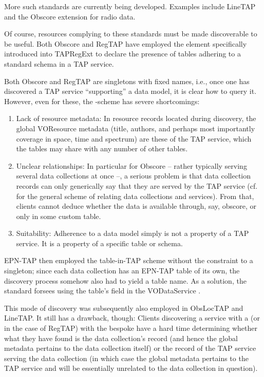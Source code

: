 \documentclass[11pt,a4paper]{ivoa}
\begin{document}
More such standards are currently being developed. Examples include LineTAP
\citep{wd:linetap23} and the Obscore extension for radio data.

Of course, resources complying to these standards must be made
discoverable to be useful.  Both Obscore and RegTAP have employed the
 element specifically introduced into TAPRegExt
\citep{2012ivoa.spec.0827D} to declare the presence of tables adhering
to a standard schema in a TAP service.

Both Obscore and RegTAP are singletons with fixed names, i.e., once one
has discovered a TAP service ``supporting'' a data model, it is clear
how to query it.  However, even for these, the -scheme
has severe shortcomings:

\begin{enumerate}
\item Lack of resource metadata: In resource records located during
discovery, the global VOResource metadata (title, authors, and perhaps
most importantly coverage in space, time and spectrum) are these of the
TAP service, which the tables may share with any number of other tables.

\item Unclear relationships: In particular for Obscore -- rather
typically serving several data collections at once --, a serious
problem is that data collection records can only generically say
that they are served by the TAP service (cf.~\citet{2019ivoa.spec.0520D}
for the general scheme of relating data collections and services).  From
that, clients cannot deduce whether the data is available through, say,
obscore, or only in some custom table.

\item Suitability: Adherence to a data model simply is not a property of a
TAP service.  It is a property of a specific table or schema.
\end{enumerate}

EPN-TAP then employed the table-in-TAP scheme without the constraint to
a singleton; since each data collection has an EPN-TAP table of its own,
the discovery process somehow also had to yield a table name.  As a
solution, the standard forsees using the table's  field in
the VODataService \citep{2010ivoa.spec.1202P} .

This mode of discovery was subsequently also employed in ObsLocTAP and
LineTAP.  It still has a drawback, though: Clients discovering a service
with a  (or  in the case of RegTAP) with the
bespoke  have a hard time determining whether what they
have found is the data collection's record (and hence the global
metadata pertains to the data collection itself) or the record of the
TAP service serving the data collection (in which case the global
metadata pertains to the TAP service and will be essentially unrelated
to the data collection in question).
\end{document}
